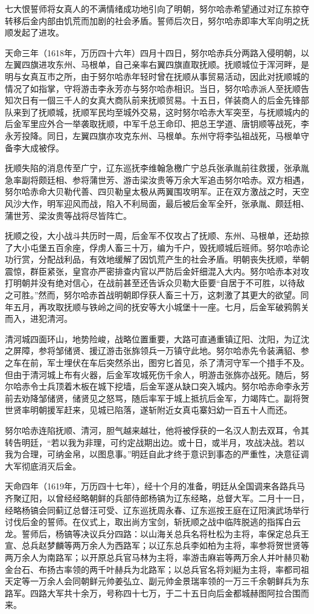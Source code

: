 七大恨誓师将女真人的不满情绪成功地引向了明朝，努尔哈赤希望通过对辽东掠夺转移后金内部由饥荒而加剧的社会矛盾。誓师后次日，努尔哈赤即率大军向明之抚顺发起了进攻。

天命三年（1618年，万历四十六年）四月十四日，努尔哈赤兵分两路入侵明朝，以左翼四旗进攻东州、马根单，自己亲率右翼四旗直取抚顺。抚顺城位于浑河畔，是明与女真互市之所，由于努尔哈赤年轻时曾在抚顺从事贸易活动，因此对抚顺城的情况了如指掌，守将游击李永芳亦与努尔哈赤相识。当日，努尔哈赤派人至抚顺告知次日有一個三千人的女真大商队前来抚顺贸易。十五日，佯装商人的后金先锋部队来到了抚顺城，抚顺军民均至城外交易，这时努尔哈赤大军突至，与抚顺城内的后金军里应外合一举袭取抚顺，中军千总王命印、把总王学道、唐钥顺等战死，李永芳投降。同日，左翼四旗亦攻克东州、马根单。东州守将李弘祖战死，马根单守备李大成被俘。

抚顺失陷的消息传至广宁，辽东巡抚李维翰急檄广宁总兵张承胤前往救援，张承胤急率副将颇廷相、参将蒲世芳、游击梁汝贵等万余大军追击努尔哈赤。双方相遇，努尔哈赤命大贝勒代善、四贝勒皇太极从两翼围攻明军。正在双方激战之时，天空风沙大作，明军迎风而战，陷入不利局面，最后被后金军全歼，张承胤、颇廷相、蒲世芳、梁汝贵等战将尽皆阵亡。

抚顺之役，大小战斗共历时一周，后金军不仅攻占了抚顺、东州、马根单，还劫掠了大小屯堡五百余座，俘虏人畜三十万，编为千户，毁抚顺城后班师。努尔哈赤论功行赏，分配战利品，有效地缓解了因饥荒产生的社会矛盾。明朝丧失抚顺，举朝震惊，群臣紧张，皇宫亦严密排查内官以严防后金奸细混入大内。努尔哈赤本对攻打明朝并没有绝对信心，在战前甚至还告诉众贝勒大臣要“自居于不可胜，以待敌之可胜。”然而，努尔哈赤首战明朝即俘获人畜三十万，这刺激了其更大的欲望。同年五月，再攻取抚顺与铁岭之间的抚安等大小城堡十一座。七月，后金军破鸦鹘关而入，进犯清河。

清河城四面环山，地势险峻，战略位置重要，大路可直通重镇辽阳、沈阳，为辽沈之屏障，参将邹储贤、援辽游击张旆领兵一万镇守此地。努尔哈赤先令装满貂、参之车在前，军士埋伏在车后突然杀出，图穷匕首见，杀了清河守军一个措手不及。但由于清河城上布有火器，后金军攻城死伤千余人，明游击张旆亦战死。随后，努尔哈赤令士兵顶着木板在城下挖墙，后金军遂从缺口突入城内。努尔哈赤命李永芳前去劝降邹储贤，储贤见之怒骂，随后率军于城上抵抗后金军，力竭阵亡。副将贺世贤率明朝援军赶来，见城已陷落，遂斩附近女真屯寨妇幼一百五十人而还。

努尔哈赤连陷抚顺、清河，胆气越来越壮，他将被俘获的一名汉人割去双耳，令其转告明廷，“若以我为非理，可约定战期出边。或十日，或半月，攻战决战。若以我为合理，可纳金帛，以图息事。”明廷自此才终于意识到事态的严重性，决意征调大军彻底消灭后金。

天命四年（1619年，万历四十七年），经十个月的准备，明廷从全国调来各路兵马齐聚辽阳，以曾经经略朝鲜的兵部侍郎杨镐为辽东经略，总督大军。二月十一日，经略杨镐会同蓟辽总督汪可受、辽东巡抚周永春、辽东巡按王庭在辽阳演武场举行讨伐后金的誓师。在仪式上，取出尚方宝剑，斩抚顺之战中临阵脱逃的指挥白云龙。誓师后，杨镐等决议兵分四路：以山海关总兵名将杜松为主将，率保定总兵王宣、总兵赵梦麟等两万余人为西路军；以辽东总兵李如柏为主将，率参将贺世贤等两万余人为南路军；以开原总兵官马林为主将，率游击麻岩等两万余人并叶赫贝勒金台石、布扬古率领的两千叶赫兵为北路军；以总兵官名将刘綎为主将，率都司祖天定等一万余人会同朝鲜元帅姜弘立、副元帅金景瑞率领的一万三千余朝鲜兵为东路军。四路大军共十余万，号称四十七万，于二十五日向后金都城赫图阿拉合围而来。

